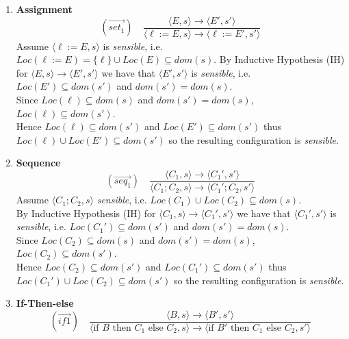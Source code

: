 \begin{solution}
\begin{enumerate}
\begin{enumerate}
\begin{enumerate}
                Since $Loc(E_2) \subseteq dom(s) $ and $dom(s') = dom(s)$, $Loc(E_2) \subseteq dom(s') $.
                \\
                Hence $Loc(E_2) \subseteq dom(s') $ and $Loc(E_1') \subseteq dom(s') $ thus $Loc(E_1') \cup Loc(E_2) \subseteq dom(s') $ so the resulting configuration is \textit{sensible}.
                \item \textbf{Assignment} 
                 \[ (\overset{\rightarrow}{set_1}) \quad \frac{\langle E,s\rangle \to \langle E', s'\rangle}{\langle \ell:=E,s\rangle \to \langle \ell:=E', s'\rangle}\]
                Assume $\langle \ell:=E,s\rangle $ is \textit{sensible}, i.e. $Loc(\ell:=E) = \{\ell\}\cup Loc(E) \subseteq dom(s)$.
                By Inductive Hypothesis (IH) for $\langle E,s\rangle \to \langle E', s'\rangle$ we have that $\langle E', s'\rangle$ is \textit{sensible}, i.e. $Loc(E') \subseteq dom(s') $ and $dom(s') = dom(s)$.
                \\
                Since $Loc(\ell) \subseteq dom(s) $ and $dom(s') = dom(s)$, $Loc(\ell) \subseteq dom(s') $.
                \\
                Hence $Loc(\ell) \subseteq dom(s') $ and $Loc(E') \subseteq dom(s') $ thus $Loc(\ell) \cup Loc(E') \subseteq dom(s') $ so the resulting configuration is \textit{sensible}.
                \item \textbf{Sequence} 
                 \[ (\overset{\rightarrow}{seq_1}) \quad \frac{\langle C_1,s\rangle \to \langle C_1', s'\rangle}{\langle C_1;C_2,s\rangle \to \langle C_1';C_2, s'\rangle}\]
                 Assume $\langle C_1;C_2,s\rangle $ \textit{sensible}, i.e. $Loc(C_1) \cup Loc(C_2) \subseteq dom(s)$.
                \\
                By Inductive Hypothesis (IH) for $\langle C_1,s\rangle \to \langle C_1', s'\rangle$ we have that $\langle C_1', s'\rangle$ is \textit{sensible}, i.e. $Loc(C_1') \subseteq dom(s') $ and $dom(s') = dom(s)$.
                \\
                Since $Loc(C_2) \subseteq dom(s) $ and $dom(s') = dom(s)$, $Loc(C_2) \subseteq dom(s') $.
                \\
                Hence $Loc(C_2) \subseteq dom(s') $ and $Loc(C_1') \subseteq dom(s') $ thus $Loc(C_1') \cup Loc(C_2) \subseteq dom(s') $ so the resulting configuration is \textit{sensible}.
                \item \textbf{If-Then-else} 
                 \[ (\overset{\rightarrow}{if1}) \quad \frac{\langle B,s\rangle \to \langle B', s'\rangle}{\langle \text{if }B \text{ then }C_1 \text{ else }C_2, s\rangle \to \langle \text{if }B' \text{ then }C_1 \text{ else }C_2, s'\rangle}\]

\end{enumerate}
\end{enumerate}
\end{enumerate}
\end{solution}
